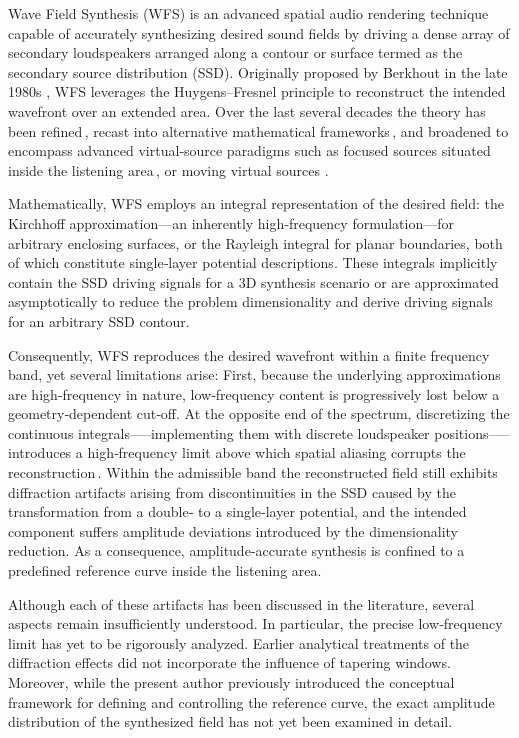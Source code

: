 \documentclass[lettersize,journal]{IEEEtran}
\begin{document}
Wave Field Synthesis (WFS) is an advanced spatial audio rendering technique capable of accurately synthesizing desired sound fields by driving a dense array of secondary loudspeakers arranged along a contour or surface termed as the secondary source distribution (SSD).
Originally proposed by Berkhout in the late 1980s \cite{Berkhout1988}, WFS leverages the Huygens–Fresnel principle to reconstruct the intended wavefront over an extended area.
Over the last several decades the theory has been refined\,\cite{Start1997:phd,Verheijen1997:phd}, recast into alternative mathematical frameworks\,\cite{Spors2008:WFSrevisited,Spors2013:Survey,Firtha2016,Firtha2019phd, Firtha2018:ieee}, and broadened to encompass advanced virtual‑source paradigms such as focused sources situated inside the listening area\,\cite{Spors2009focused,Wierstorf2013focused}, or moving virtual sources \cite{Ahrens2008moving, doi:10.1121/1.4996126}.

Mathematically, WFS employs an integral representation of the desired field: the Kirchhoff approximation—an inherently high‑frequency formulation—for arbitrary enclosing surfaces, or the Rayleigh integral for planar boundaries, both of which constitute single‑layer potential descriptions.  
These integrals implicitly contain the SSD driving signals for a 3D synthesis scenario or are approximated asymptotically to reduce the problem dimensionality and derive driving signals for an arbitrary SSD contour.

Consequently, WFS reproduces the desired wavefront within a finite frequency band, yet several limitations arise:  
First, because the underlying approximations are high‑frequency in nature, low‑frequency content is progressively lost below a geometry‑dependent cut‑off.  
At the opposite end of the spectrum, discretizing the continuous integrals—--implementing them with discrete loudspeaker positions--—introduces a high‑frequency limit above which spatial aliasing corrupts the reconstruction\,\cite{8611109}. 
Within the admissible band the reconstructed field still exhibits diffraction artifacts arising from discontinuities in the SSD caused by the transformation from a double‑ to a single‑layer potential, and the intended component suffers amplitude deviations introduced by the dimensionality reduction.  
As a consequence, amplitude‑accurate synthesis is confined to a predefined reference curve inside the listening area.

Although each of these artifacts has been discussed in the literature, several aspects remain insufficiently understood.  
In particular, the precise low‑frequency limit has yet to be rigorously analyzed.  
Earlier analytical treatments of the diffraction effects did not incorporate the influence of tapering windows.  
Moreover, while the present author previously introduced the conceptual framework for defining and controlling the reference curve, the exact amplitude distribution of the synthesized field has not yet been examined in detail.
\end{document}
